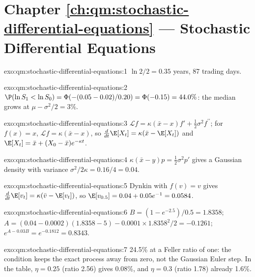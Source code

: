 \section*{Chapter \ref{ch:qm:stochastic-differential-equations} --- Stochastic Differential Equations}

\begin{solution}{exo:qm:stochastic-differential-equations:1}
$\ln 2/2 = 0.35$ years, 87 trading days.
\end{solution}

\begin{solution}{exo:qm:stochastic-differential-equations:2}
$\P(\ln S_1 < \ln S_0) = \Phi(-(0.05 - 0.02)/0.20) = \Phi(-0.15) = 44.0\%$: the median grows at $\mu -
\sigma^2/2 = 3\%$.
\end{solution}

\begin{solution}{exo:qm:stochastic-differential-equations:3}
$\mathcal Lf = \kappa(\bar x - x)f' + \tfrac12\sigma^2f^{\prime\prime}$; for $f(x) = x$, $\mathcal Lf = \kappa(\bar x - x)$, so
$\frac{d}{dt}\E[X_t] = \kappa(\bar x - \E[X_t])$ and $\E[X_t] = \bar x + (X_0 - \bar x)e^{-\kappa t}$.
\end{solution}

\begin{solution}{exo:qm:stochastic-differential-equations:4}
$\kappa(\bar x - y)p = \tfrac12\sigma^2p'$ gives a Gaussian density with variance $\sigma^2/2\kappa = 0.16/4 = 0.04$.
\end{solution}

\begin{solution}{exo:qm:stochastic-differential-equations:5}
Dynkin with $f(v) = v$ gives $\frac{d}{dt}\E[v_t] = \kappa(\bar v - \E[v_t])$, so $\E[v_{0.5}] = 0.04 + 0.05e^{-1} =
0.0584$.
\end{solution}

\begin{solution}{exo:qm:stochastic-differential-equations:6}
$B = (1 - e^{-2.5})/0.5 = 1.8358$; $A = (0.04 - 0.0002)(1.8358 - 5) - 0.0001 \times 1.8358^2/2 = -0.1261$;
$e^{A - 0.03B} = e^{-0.1812} = 0.8343$.
\end{solution}

\begin{solution}{exo:qm:stochastic-differential-equations:7}
24.5\% at a Feller ratio of one: the condition keeps the exact process away from zero, not the
Gaussian Euler step. In the table, $\eta = 0.25$ (ratio 2.56) gives 0.08\%, and $\eta = 0.3$ (ratio 1.78)
already 1.6\%.
\end{solution}

